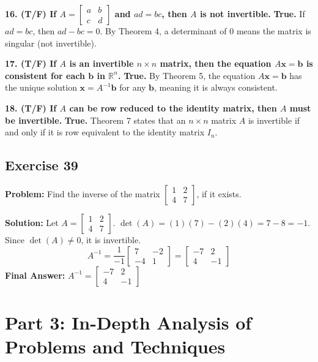 \documentclass[11pt]{article}
\begin{document}
\textbf{16. (T/F) If $A = \begin{bmatrix} a & b \\ c & d \end{bmatrix}$ and $ad = bc$, then $A$ is not invertible.}
\textbf{True.} If $ad = bc$, then $ad - bc = 0$. By Theorem 4, a determinant of 0 means the matrix is singular (not invertible).

\textbf{17. (T/F) If $A$ is an invertible $n \times n$ matrix, then the equation $A\mathbf{x} = \mathbf{b}$ is consistent for each $\mathbf{b}$ in $\mathbb{R}^n$.}
\textbf{True.} By Theorem 5, the equation $A\mathbf{x} = \mathbf{b}$ has the unique solution $\mathbf{x} = A^{-1}\mathbf{b}$ for any $\mathbf{b}$, meaning it is always consistent.

\textbf{18. (T/F) If $A$ can be row reduced to the identity matrix, then $A$ must be invertible.}
\textbf{True.} Theorem 7 states that an $n \times n$ matrix $A$ is invertible if and only if it is row equivalent to the identity matrix $I_n$.

\subsection{Exercise 39}
\textbf{Problem:} Find the inverse of the matrix $\begin{bmatrix} 1 & 2 \\ 4 & 7 \end{bmatrix}$, if it exists.

\textbf{Solution:}
Let $A = \begin{bmatrix} 1 & 2 \\ 4 & 7 \end{bmatrix}$. 
$\det(A) = (1)(7) - (2)(4) = 7 - 8 = -1$.
Since $\det(A) \neq 0$, it is invertible.
\[ A^{-1} = \frac{1}{-1} \begin{bmatrix} 7 & -2 \\ -4 & 1 \end{bmatrix} = \begin{bmatrix} -7 & 2 \\ 4 & -1 \end{bmatrix} \]
\textbf{Final Answer:} $A^{-1} = \begin{bmatrix} -7 & 2 \\ 4 & -1 \end{bmatrix}$

\newpage
\section{Part 3: In-Depth Analysis of Problems and Techniques}
\end{document}
